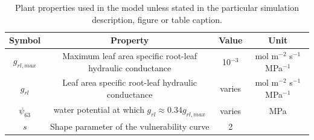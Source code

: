 \documentclass[utf8]{frontiersSCNS} %
\begin{document}
\begin{table}[h]
    \centering
    \begin{tabular}{c|c|c|c}
        Symbol & Property & Value & Unit \\
        \hline
        $g_{rl,max}$ & Maximum leaf area specific root-leaf hydraulic conductance & 10$^{-3}$ & mol m$^{-2}$ s$^{-1}$ MPa$^{-1}$ \\
        $g_{rl}$ & Leaf area specific root-leaf hydraulic conductance & varies & mol m$^{-2}$ s$^{-1}$ MPa$^{-1}$ \\
        $\psi_{63}$ & water potential at which $g_{rl} \approx 0.34 g_{rl,max}$ & varies & MPa \\
        $s$ & Shape parameter of the vulnerability curve & 2 &  \\
    \end{tabular}
    \caption{Plant properties used in the model unless stated in the particular simulation description, figure or table caption.}
    \label{tab:plant_props}
\end{table}






\end{document}
